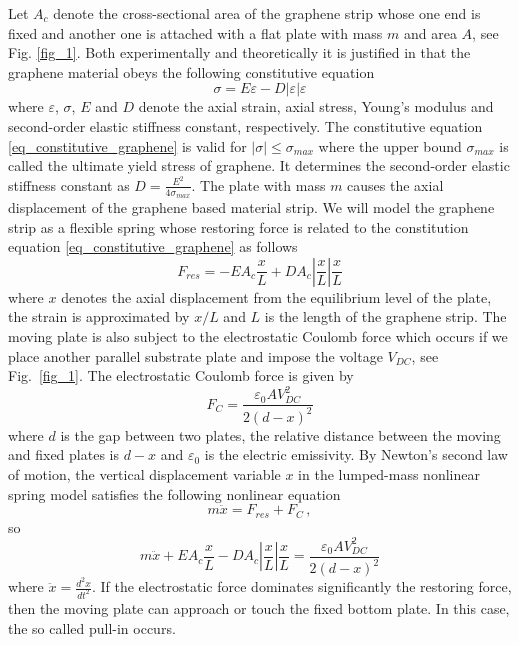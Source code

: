 \documentclass[review]{elsarticle}
\begin{document}
Let $A_c$ denote the
cross-sectional area of the graphene strip whose one end is fixed and another one
is attached with a flat plate with mass $m$ and area $A$, see Fig. \ref{fig_1}. Both experimentally and theoretically it is justified in \cite{Lee, Lu} that the graphene material obeys the following constitutive equation
\begin{equation}\label{eq_constitutive_graphene}
\sigma = E\varepsilon - D|\varepsilon|\varepsilon
\end{equation}
where $\varepsilon$,  $\sigma$,  $E$ and $D$ denote the axial strain, axial stress, Young's modulus and second-order elastic stiffness constant, respectively. The constitutive equation \eqref{eq_constitutive_graphene} is valid  for $|\sigma|\le \sigma_{max}$ where the upper bound $\sigma_{max}$ is called the ultimate yield stress of graphene. It determines the second-order elastic stiffness constant as $D=\frac{E^2}{4\sigma_{max}}$. The plate with mass $m$ causes the axial displacement of the graphene based material strip. We will model the graphene strip as a flexible spring whose restoring force is related to the constitution equation \eqref{eq_constitutive_graphene} as follows
\begin{equation}
F_{res} = -EA_c\frac{x}{L}+DA_c\left|\frac{x}{L}\right|\frac{x}{L}
\end{equation}
where $x$ denotes the axial displacement from the equilibrium level of the plate, the strain is approximated by $x/L$ and $L$ is the length of the graphene strip. The moving plate is also subject to the electrostatic Coulomb force which occurs if we place another parallel substrate plate and impose the voltage $V_{DC}$, see Fig.~\ref{fig_1}. The electrostatic Coulomb force is given by
\begin{equation}
F_{C} = \frac{\varepsilon_0 AV_{DC}^2}{2(d-x)^2}
\end{equation}
where $d$ is the gap between two plates, the relative distance between the moving and fixed plates is $d-x$ and $\varepsilon_0$ is the electric emissivity. By Newton’s second law of motion, the vertical displacement variable $x$ in the lumped-mass nonlinear spring model satisfies the following nonlinear equation
\[
m \ddot{x}=F_{res}+F_{C}\,,
\]
so
\begin{equation}\label{eq_dim}
m\ddot{x}+EA_c\frac{x}{L}-DA_c\left|\frac{x}{L}\right|\frac{x}{L}=\frac{\varepsilon_0 AV_{DC}^2}{2(d-x)^2}
\end{equation}
where $\ddot{x}=\frac{d^2x}{dt^2}$. If the electrostatic force dominates significantly the restoring force, then the moving plate can approach or touch the fixed bottom plate. In this case, the so called pull-in occurs.
\end{document}
